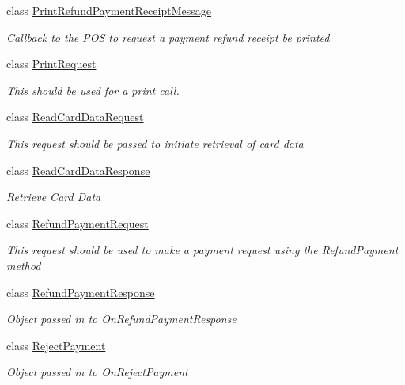 \begin{DoxyCompactItemize}
class \hyperlink{classcom_1_1clover_1_1remotepay_1_1sdk_1_1_print_refund_payment_receipt_message}{Print\+Refund\+Payment\+Receipt\+Message}
\begin{DoxyCompactList}\small\item\em Callback to the P\+OS to request a payment refund receipt be printed \end{DoxyCompactList}\item 
class \hyperlink{classcom_1_1clover_1_1remotepay_1_1sdk_1_1_print_request}{Print\+Request}
\begin{DoxyCompactList}\small\item\em This should be used for a print call. \end{DoxyCompactList}\item 
class \hyperlink{classcom_1_1clover_1_1remotepay_1_1sdk_1_1_read_card_data_request}{Read\+Card\+Data\+Request}
\begin{DoxyCompactList}\small\item\em This request should be passed to initiate retrieval of card data \end{DoxyCompactList}\item 
class \hyperlink{classcom_1_1clover_1_1remotepay_1_1sdk_1_1_read_card_data_response}{Read\+Card\+Data\+Response}
\begin{DoxyCompactList}\small\item\em Retrieve Card Data \end{DoxyCompactList}\item 
class \hyperlink{classcom_1_1clover_1_1remotepay_1_1sdk_1_1_refund_payment_request}{Refund\+Payment\+Request}
\begin{DoxyCompactList}\small\item\em This request should be used to make a payment request using the Refund\+Payment method \end{DoxyCompactList}\item 
class \hyperlink{classcom_1_1clover_1_1remotepay_1_1sdk_1_1_refund_payment_response}{Refund\+Payment\+Response}
\begin{DoxyCompactList}\small\item\em Object passed in to On\+Refund\+Payment\+Response \end{DoxyCompactList}\item 
class \hyperlink{classcom_1_1clover_1_1remotepay_1_1sdk_1_1_reject_payment}{Reject\+Payment}
\begin{DoxyCompactList}\small\item\em Object passed in to On\+Reject\+Payment \end{DoxyCompactList}\item 

\end{DoxyCompactItemize}
